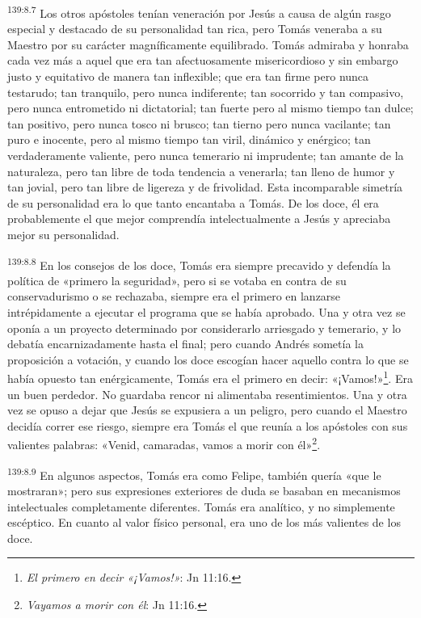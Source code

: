 \par
\textsuperscript{139:8.7} Los otros apóstoles tenían veneración por Jesús a causa de algún rasgo especial y destacado de su personalidad tan rica, pero Tomás veneraba a su Maestro por su carácter magníficamente equilibrado. Tomás admiraba y honraba cada vez más a aquel que era tan afectuosamente misericordioso y sin embargo justo y equitativo de manera tan inflexible; que era tan firme pero nunca testarudo; tan tranquilo, pero nunca indiferente; tan socorrido y tan compasivo, pero nunca entrometido ni dictatorial; tan fuerte pero al mismo tiempo tan dulce; tan positivo, pero nunca tosco ni brusco; tan tierno pero nunca vacilante; tan puro e inocente, pero al mismo tiempo tan viril, dinámico y enérgico; tan verdaderamente valiente, pero nunca temerario ni imprudente; tan amante de la naturaleza, pero tan libre de toda tendencia a venerarla; tan lleno de humor y tan jovial, pero tan libre de ligereza y de frivolidad. Esta incomparable simetría de su personalidad era lo que tanto encantaba a Tomás. De los doce, él era probablemente el que mejor comprendía intelectualmente a Jesús y apreciaba mejor su personalidad.

\par
\textsuperscript{139:8.8} En los consejos de los doce, Tomás era siempre precavido y defendía la política de «primero la seguridad», pero si se votaba en contra de su conservadurismo o se rechazaba, siempre era el primero en lanzarse intrépidamente a ejecutar el programa que se había aprobado. Una y otra vez se oponía a un proyecto determinado por considerarlo arriesgado y temerario, y lo debatía encarnizadamente hasta el final; pero cuando Andrés sometía la proposición a votación, y cuando los doce escogían hacer aquello contra lo que se había opuesto tan enérgicamente, Tomás era el primero en decir: «¡Vamos!»\footnote{\textit{El primero en decir «¡Vamos!»}: Jn 11:16.}. Era un buen perdedor. No guardaba rencor ni alimentaba resentimientos. Una y otra vez se opuso a dejar que Jesús se expusiera a un peligro, pero cuando el Maestro decidía correr ese riesgo, siempre era Tomás el que reunía a los apóstoles con sus valientes palabras: «Venid, camaradas, vamos a morir con él»\footnote{\textit{Vayamos a morir con él}: Jn 11:16.}.

\par
\textsuperscript{139:8.9} En algunos aspectos, Tomás era como Felipe, también quería «que le mostraran»; pero sus expresiones exteriores de duda se basaban en mecanismos intelectuales completamente diferentes. Tomás era analítico, y no simplemente escéptico. En cuanto al valor físico personal, era uno de los más valientes de los doce.

